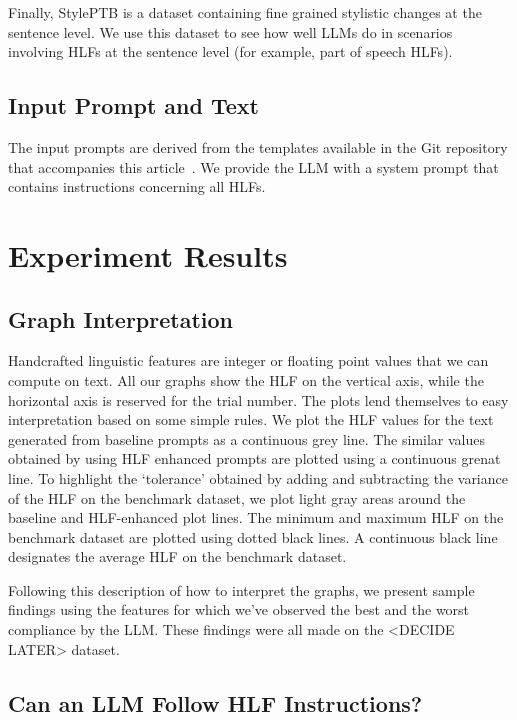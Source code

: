 \documentclass[runningheads,a4paper,11pt]{article}
\begin{document}
Finally, StylePTB is a dataset containing fine grained stylistic changes at the
sentence level. We use this dataset to see how well LLMs do in scenarios
involving HLFs at the sentence level (for example, part of speech HLFs).

\subsection{Input Prompt and Text}\label{input-text}

The input prompts are derived from the templates available in the Git repository
that accompanies this article~\cite{olar2024experimentcode}.
We provide the LLM with a system prompt that contains instructions concerning
all HLFs.

\section{Experiment Results}

\subsection{Graph Interpretation}

Handcrafted linguistic features are integer or floating point values that we
can compute on text.
All our graphs show the HLF on the vertical axis, while the horizontal axis is
reserved for the trial number.
The plots lend themselves to easy interpretation based on some simple rules.
We plot the HLF values for the text generated from baseline prompts as a
continuous grey line.
The similar values obtained by using HLF enhanced prompts are plotted using a
continuous grenat line.
To highlight the `tolerance' obtained by adding and subtracting the variance of
the HLF on the benchmark dataset, we plot light gray areas around the baseline
and HLF-enhanced plot lines.
The minimum and maximum HLF on the benchmark dataset are plotted using dotted
black lines.
A continuous black line designates the average HLF on the benchmark dataset.

Following this description of how to interpret the graphs, we present sample
findings using the features for which we've observed the best and the worst
compliance by the LLM.
These findings were all made on the <DECIDE LATER> dataset.

\subsection{Can an LLM Follow HLF Instructions?}
\end{document}

